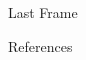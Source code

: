 \documentclass[compress,aspectratio=169]{beamer}
\begin{document}
\begin{frame}{Last Frame}
\label{pg:lastpage} %

\end{frame}

\begin{frame}{References}
    \renewcommand*{\bibfont}{\normalfont\scriptsize}
    \printbibliography[heading=none]
\end{frame}
\end{document}
